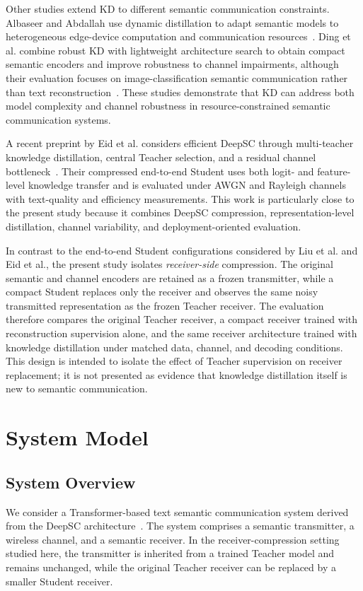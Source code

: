 \documentclass[conference]{IEEEtran}
\begin{document}
Other studies extend KD to different semantic communication constraints. Albaseer and Abdallah use dynamic distillation to adapt semantic models to heterogeneous edge-device computation and communication resources~\cite{albaseer2024dynamickd}. Ding et al. combine robust KD with lightweight architecture search to obtain compact semantic encoders and improve robustness to channel impairments, although their evaluation focuses on image-classification semantic communication rather than text reconstruction~\cite{ding2026robustkd}. These studies demonstrate that KD can address both model complexity and channel robustness in resource-constrained semantic communication systems.

A recent preprint by Eid et al. considers efficient DeepSC through multi-teacher knowledge distillation, central Teacher selection, and a residual channel bottleneck~\cite{eid2026krumdeepsc}. Their compressed end-to-end Student uses both logit- and feature-level knowledge transfer and is evaluated under AWGN and Rayleigh channels with text-quality and efficiency measurements. This work is particularly close to the present study because it combines DeepSC compression, representation-level distillation, channel variability, and deployment-oriented evaluation.

In contrast to the end-to-end Student configurations considered by Liu et al. and Eid et al., the present study isolates \emph{receiver-side} compression. The original semantic and channel encoders are retained as a frozen transmitter, while a compact Student replaces only the receiver and observes the same noisy transmitted representation as the frozen Teacher receiver. The evaluation therefore compares the original Teacher receiver, a compact receiver trained with reconstruction supervision alone, and the same receiver architecture trained with knowledge distillation under matched data, channel, and decoding conditions. This design is intended to isolate the effect of Teacher supervision on receiver replacement; it is not presented as evidence that knowledge distillation itself is new to semantic communication.

\section{System Model}
\label{sec:system}

\subsection{System Overview}
We consider a Transformer-based text semantic communication system derived from the DeepSC architecture~\cite{xie2021deepsc}. The system comprises a semantic transmitter, a wireless channel, and a semantic receiver. In the receiver-compression setting studied here, the transmitter is inherited from a trained Teacher model and remains unchanged, while the original Teacher receiver can be replaced by a smaller Student receiver.
\end{document}
